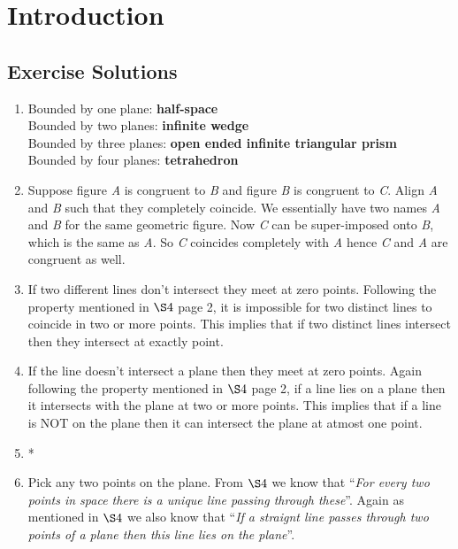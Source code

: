 \chapter{Introduction}

\section*{Exercise Solutions}

\begin{enumerate}
	\item Bounded by one plane: \textbf{half-space} \\
	Bounded by two planes: \textbf{infinite wedge} \\
	Bounded by three planes: \textbf{open ended infinite triangular prism} \\
	Bounded by four planes: \textbf{tetrahedron}
	
	\item Suppose figure \textit{A} is congruent to \textit{B} and figure \textit{B} is congruent to \textit{C}. Align \textit{A} and \textit{B} such that they completely coincide. We essentially have two names \textit{A} and \textit{B} for the same geometric figure. Now \textit{C} can be super-imposed onto \textit{B}, which is the same as \textit{A}. So \textit{C} coincides completely with \textit{A} hence \textit{C} and \textit{A} are congruent as well.
	
	\item If two different lines don't intersect they meet at zero points. Following the property mentioned in $\S4$ page 2, it is impossible for two distinct lines to coincide in two or more points. This implies that if two distinct lines intersect then they intersect at exactly point.
	
	\item If the line doesn't intersect a plane then they meet at zero points. Again following the property mentioned in $\S4$ page 2, if a line lies on a plane then it intersects with the plane at two or more points. This implies that if a line is NOT on the plane then it can intersect the plane at atmost one point.
		
	\item *
	
	\item Pick any two points on the plane. From $\S4$ we know that ``\textit{For every two points in space there is a unique line passing through these}''. Again as mentioned in $\S4$ we also know that ``\textit{If a straignt line passes through two points of a plane then this line lies on the plane}''. 
	

\end{enumerate}

